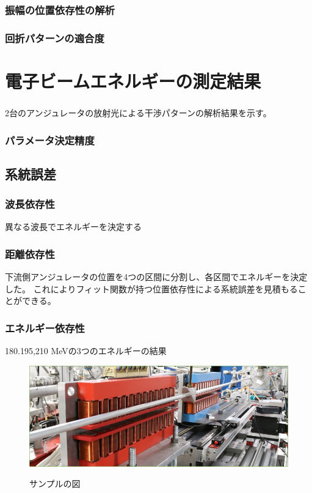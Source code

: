 \documentclass[a4paper,11pt,uplatex]{jsbook}
\begin{document}
\subsubsection{振幅の位置依存性の解析}
\subsubsection{回折パターンの適合度}


\section{電子ビームエネルギーの測定結果}
\subsubsection{}
2台のアンジュレータの放射光による干渉パターンの解析結果を示す。
\subsubsection{パラメータ決定精度}

\subsection{系統誤差}
\subsubsection{波長依存性}
異なる波長でエネルギーを決定する

\subsubsection{距離依存性}
下流側アンジュレータの位置を4つの区間に分割し、各区間でエネルギーを決定した。
これによりフィット関数が持つ位置依存性による系統誤差を見積もることができる。

\subsubsection{エネルギー依存性}
180.195,210 MeVの3つのエネルギーの結果












\clearpage

\begin{figure}[tb]
  \centering
  \includegraphics[width=0.8\linewidth]{image/1-1.jpg}\\
  \caption{サンプルの図}
  \label{sample_image}
\end{figure}
\end{document}
